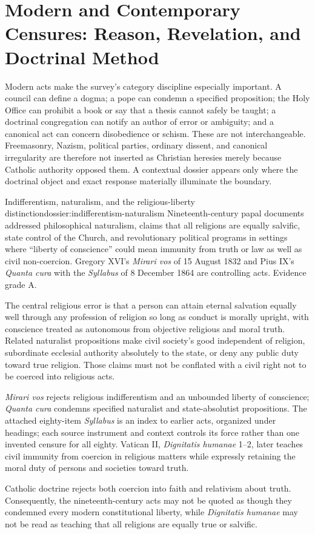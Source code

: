 \section{Modern and Contemporary Censures: Reason, Revelation, and Doctrinal Method}

Modern acts make the survey's category discipline especially important. A council can define a dogma; a pope can condemn a specified proposition; the Holy Office can prohibit a book or say that a thesis cannot safely be taught; a doctrinal congregation can notify an author of error or ambiguity; and a canonical act can concern disobedience or schism. These are not interchangeable. Freemasonry, Nazism, political parties, ordinary dissent, and canonical irregularity are therefore not inserted as Christian heresies merely because Catholic authority opposed them. A contextual dossier appears only where the doctrinal object and exact response materially illuminate the boundary.

\begin{heresydossier}{Indifferentism, naturalism, and the religious-liberty distinction}{dossier:indifferentism-naturalism}
\objectfield Nineteenth-century papal documents addressed philosophical naturalism, claims that all religions are equally salvific, state control of the Church, and revolutionary political programs in settings where ``liberty of conscience'' could mean immunity from truth or law as well as civil non-coercion. Gregory XVI's \emph{Mirari vos} of 15 August 1832 and Pius IX's \emph{Quanta cura} with the \emph{Syllabus} of 8 December 1864 are controlling acts. Evidence grade A.

\propositionfield The central religious error is that a person can attain eternal salvation equally well through any profession of religion so long as conduct is morally upright, with conscience treated as autonomous from objective religious and moral truth. Related naturalist propositions make civil society's good independent of religion, subordinate ecclesial authority absolutely to the state, or deny any public duty toward true religion. Those claims must not be conflated with a civil right not to be coerced into religious acts.

\responsefield \emph{Mirari vos} rejects religious indifferentism and an unbounded liberty of conscience; \emph{Quanta cura} condemns specified naturalist and state-absolutist propositions. The attached eighty-item \emph{Syllabus} is an index to earlier acts, organized under headings; each source instrument and context controls its force rather than one invented censure for all eighty. Vatican II, \emph{Dignitatis humanae} 1--2, later teaches civil immunity from coercion in religious matters while expressly retaining the moral duty of persons and societies toward truth.

\aftermathfield Catholic doctrine rejects both coercion into faith and relativism about truth. Consequently, the nineteenth-century acts may not be quoted as though they condemned every modern constitutional liberty, while \emph{Dignitatis humanae} may not be read as teaching that all religions are equally true or salvific.
\end{heresydossier}

